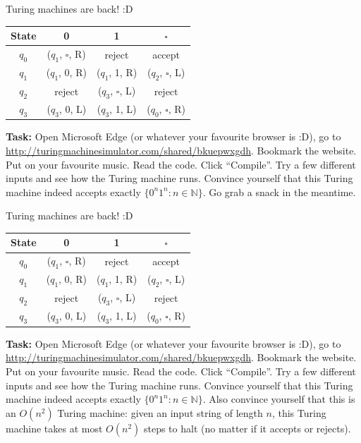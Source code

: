 \documentclass{beamer}
\begin{document}
\begin{frame}{Turing machines are back! :D}

\begin{center}
\begin{tabular}{c|c|c|c}
State & 0 & 1 & $\square$\\
\hline
$q_0$ & ($q_1$, $\square$, R) & reject & accept\\
\hline
$q_1$ & ($q_1$, 0, R) & ($q_1$, 1, R) & ($q_2$, $\square$, L)\\
\hline
$q_2$ & reject & ($q_3$, $\square$, L) & reject\\
\hline
$q_3$ & ($q_3$, 0, L) & ($q_3$, 1, L) & ($q_0$, $\square$, R)\\
\end{tabular}
\end{center}

\textbf{Task:} Open Microsoft Edge (or whatever your favourite browser is :D), go to \url{http://turingmachinesimulator.com/shared/bkuepwxgdh}. Bookmark the website. Put on your favourite music. Read the code. Click ``Compile''. Try a few different inputs and see how the Turing machine runs. Convince yourself that this Turing machine indeed accepts exactly $\{0^n 1^n: n \in \mathbb N\}$. Go grab a snack in the meantime.

\end{frame}

\begin{frame}{Turing machines are back! :D}

\begin{center}
\begin{tabular}{c|c|c|c}
State & 0 & 1 & $\square$\\
\hline
$q_0$ & ($q_1$, $\square$, R) & reject & accept\\
\hline
$q_1$ & ($q_1$, 0, R) & ($q_1$, 1, R) & ($q_2$, $\square$, L)\\
\hline
$q_2$ & reject & ($q_3$, $\square$, L) & reject\\
\hline
$q_3$ & ($q_3$, 0, L) & ($q_3$, 1, L) & ($q_0$, $\square$, R)\\
\end{tabular}
\end{center}

\textbf{Task:} Open Microsoft Edge (or whatever your favourite browser is :D), go to \url{http://turingmachinesimulator.com/shared/bkuepwxgdh}. Bookmark the website. Put on your favourite music. Read the code. Click ``Compile''. Try a few different inputs and see how the Turing machine runs. Convince yourself that this Turing machine indeed accepts exactly $\{0^n 1^n: n \in \mathbb N\}$. Also convince yourself that this is an $O(n^2)$ Turing machine: given an input string of length $n$, this Turing machine takes at most $O(n^2)$ steps to halt (no matter if it accepts or rejects).

\end{frame}
\end{document}
